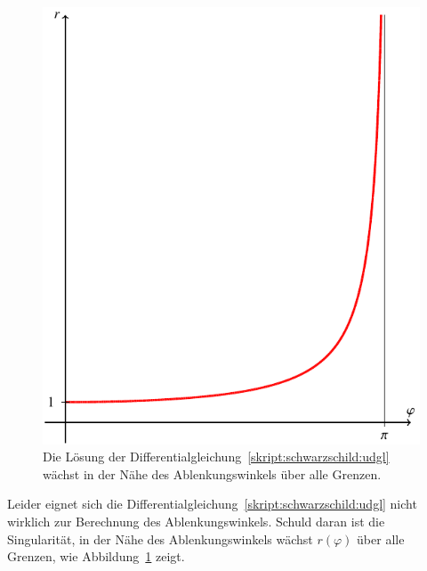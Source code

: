 \begin{figure}
\centering
\includegraphics{chapters/tikz/lichtablenkung.pdf}
\caption{Die Lösung der Differentialgleichung~\eqref{skript:schwarzschild:udgl}
wächst in der Nähe des Ablenkungswinkels über alle Grenzen.
\label{skript:schwarzschild:abbildung:rphi}}
\end{figure}
Leider eignet sich die Differentialgleichung~\eqref{skript:schwarzschild:udgl}
nicht wirklich zur Berechnung des Ablenkungswinkels.
Schuld daran ist die Singularität, in der Nähe des Ablenkungswinkels
wächst $r(\varphi)$ über alle Grenzen, wie
Abbildung~\ref{skript:schwarzschild:abbildung:rphi} zeigt.

